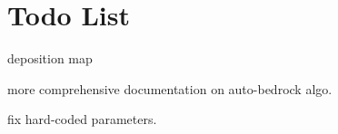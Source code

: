 \chapter{Todo List}
\hypertarget{todo}{}\label{todo}

\begin{DoxyRefList}
\item[Member \doxylink{namespacehmap_1_1gpu_a3ce50c0ae884fda9291545ca40ab36c1}{hmap\+::gpu\+::sediment\+\_\+deposition} (\doxylink{classhmap_1_1Array}{Array} \&z, const \doxylink{classhmap_1_1Array}{Array} \texorpdfstring{$\ast$}{*}p\+\_\+mask, const \doxylink{classhmap_1_1Array}{Array} \&talus, \doxylink{classhmap_1_1Array}{Array} \texorpdfstring{$\ast$}{*}p\+\_\+deposition\+\_\+map=nullptr, float max\+\_\+deposition=0.\+01, int iterations=5, int thermal\+\_\+subiterations=10)]\label{todo__todo000001}%
%
deposition map 
\item[Member \doxylink{namespacehmap_1_1gpu_a36a2eba6d158e44d0ef917d9582987fe}{hmap\+::gpu\+::thermal\+\_\+auto\+\_\+bedrock} (\doxylink{classhmap_1_1Array}{Array} \&z, const \doxylink{classhmap_1_1Array}{Array} \&talus, int iterations=10, \doxylink{classhmap_1_1Array}{Array} \texorpdfstring{$\ast$}{*}p\+\_\+deposition\+\_\+map=nullptr)]\label{todo__todo000002}%
%
more comprehensive documentation on auto-\/bedrock algo. 



fix hard-\/coded parameters.
\end{DoxyRefList}